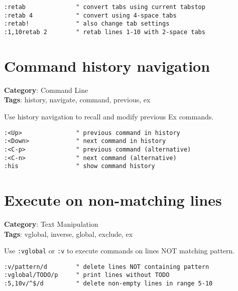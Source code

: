 {{{{\begin{Exa*}{}
\begin{Verbatim}[fontsize=\footnotesize, breaklines, breakanywhere]
:retab              " convert tabs using current tabstop
:retab 4            " convert using 4-space tabs
:retab!             " also change tab settings
:1,10retab 2        " retab lines 1-10 with 2-space tabs
\end{Verbatim}
\end{Exa*}

\section{Command history navigation}

\textbf{Category}: Command Line\\ \textbf{Tags}: history, navigate, command, previous, ex
\vspace{0.5cm}

Use history navigation to recall and modify previous Ex commands.

\begin{Exa*}{}
\begin{Verbatim}[fontsize=\footnotesize, breaklines, breakanywhere]
:<Up>               " previous command in history
:<Down>             " next command in history
:<C-p>              " previous command (alternative)
:<C-n>              " next command (alternative)
:his                " show command history
\end{Verbatim}
\end{Exa*}

\section{Execute on non-matching lines}

\textbf{Category}: Text Manipulation\\ \textbf{Tags}: vglobal, inverse, global, exclude, ex
\vspace{0.5cm}

Use {\footnotesize \Verb§:vglobal§} or {\footnotesize \Verb§:v§} to execute commands on lines NOT matching pattern.

\begin{Exa*}{}
\begin{Verbatim}[fontsize=\footnotesize, breaklines, breakanywhere]
:v/pattern/d        " delete lines NOT containing pattern
:vglobal/TODO/p     " print lines without TODO
:5,10v/^$/d         " delete non-empty lines in range 5-10
\end{Verbatim}
\end{Exa*}

}}}}
